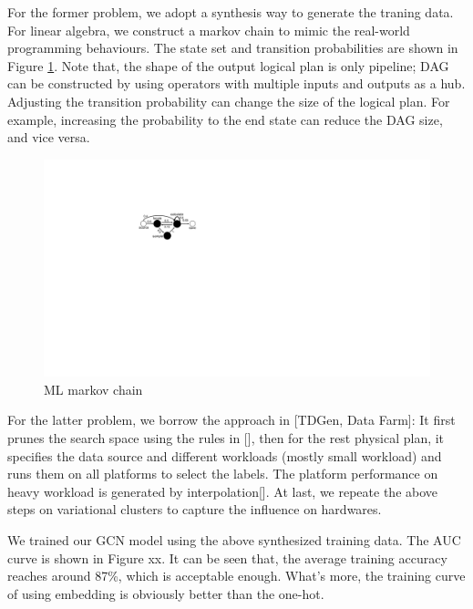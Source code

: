 For the former problem, we adopt a synthesis way to generate the traning data. 
For linear algebra, we construct a markov chain to mimic the real-world programming behaviours.
The state set and transition probabilities are shown in Figure \ref{fig:ml-markov}.
Note that, the shape of the output logical plan is only pipeline; 
DAG can be constructed by using operators with multiple inputs and outputs as a hub.
Adjusting the transition probability can change the size of the logical plan.
For example, increasing the probability to the end state can reduce the DAG size, and vice versa.

\begin{figure}
  \centering
  \includegraphics[width=0.5\linewidth]{figures/ml-fsm.pdf}
  \caption{ML markov chain}
  \label{fig:ml-markov}
\end{figure}


For the latter problem, we borrow the approach in [TDGen, Data Farm]:
It first prunes the search space using the rules in [], then for the rest physical plan, 
it specifies the data source and different workloads (mostly small workload) and runs them on all platforms to select the labels.
The platform performance on heavy workload is generated by interpolation[].
At last, we repeate the above steps on variational clusters to capture the influence on hardwares.

We trained our GCN model using the above synthesized training data.
The AUC curve is shown in Figure xx.
It can be seen that, the average training accuracy reaches around 87\%, which is acceptable enough.
What's more, the training curve of using embedding is obviously better than the one-hot.